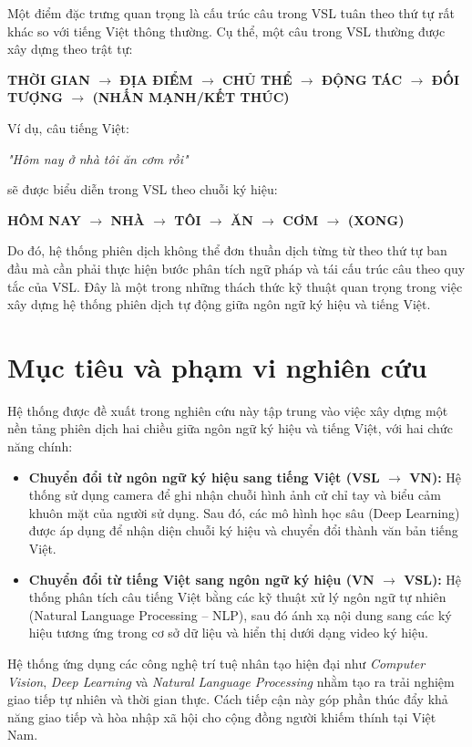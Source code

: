 Một điểm đặc trưng quan trọng là cấu trúc câu trong VSL tuân theo thứ tự rất khác so với tiếng Việt thông thường. Cụ thể, một câu trong VSL thường được xây dựng theo trật tự:
 
\begin{center}
\textbf{THỜI GIAN $\rightarrow$ ĐỊA ĐIỂM $\rightarrow$ CHỦ THỂ $\rightarrow$ ĐỘNG TÁC $\rightarrow$ ĐỐI TƯỢNG $\rightarrow$ (NHẤN MẠNH/KẾT THÚC)}
\end{center}
 
Ví dụ, câu tiếng Việt:
 
\textit{"Hôm nay ở nhà tôi ăn cơm rồi"}
 
sẽ được biểu diễn trong VSL theo chuỗi ký hiệu:
 
\begin{center}
\textbf{HÔM NAY $\rightarrow$ NHÀ $\rightarrow$ TÔI $\rightarrow$ ĂN $\rightarrow$ CƠM $\rightarrow$ (XONG)}
\end{center}
 
Do đó, hệ thống phiên dịch không thể đơn thuần dịch từng từ theo thứ tự ban đầu mà cần phải thực hiện bước phân tích ngữ pháp và tái cấu trúc câu theo quy tắc của VSL. Đây là một trong những thách thức kỹ thuật quan trọng trong việc xây dựng hệ thống phiên dịch tự động giữa ngôn ngữ ký hiệu và tiếng Việt.
 
\section{Mục tiêu và phạm vi nghiên cứu}
 
Hệ thống được đề xuất trong nghiên cứu này tập trung vào việc xây dựng một nền tảng phiên dịch hai chiều giữa ngôn ngữ ký hiệu và tiếng Việt, với hai chức năng chính:
 
\begin{itemize}
    \item \textbf{Chuyển đổi từ ngôn ngữ ký hiệu sang tiếng Việt (VSL $\rightarrow$ VN):}
    Hệ thống sử dụng camera để ghi nhận chuỗi hình ảnh cử chỉ tay và biểu cảm khuôn mặt của người sử dụng. Sau đó, các mô hình học sâu (Deep Learning) được áp dụng để nhận diện chuỗi ký hiệu và chuyển đổi thành văn bản tiếng Việt.
 
    \item \textbf{Chuyển đổi từ tiếng Việt sang ngôn ngữ ký hiệu (VN $\rightarrow$ VSL):}
    Hệ thống phân tích câu tiếng Việt bằng các kỹ thuật xử lý ngôn ngữ tự nhiên (Natural Language Processing -- NLP), sau đó ánh xạ nội dung sang các ký hiệu tương ứng trong cơ sở dữ liệu và hiển thị dưới dạng video ký hiệu.
\end{itemize}
 
Hệ thống ứng dụng các công nghệ trí tuệ nhân tạo hiện đại như \textit{Computer Vision}, \textit{Deep Learning} và \textit{Natural Language Processing} nhằm tạo ra trải nghiệm giao tiếp tự nhiên và thời gian thực. Cách tiếp cận này góp phần thúc đẩy khả năng giao tiếp và hòa nhập xã hội cho cộng đồng người khiếm thính tại Việt Nam.